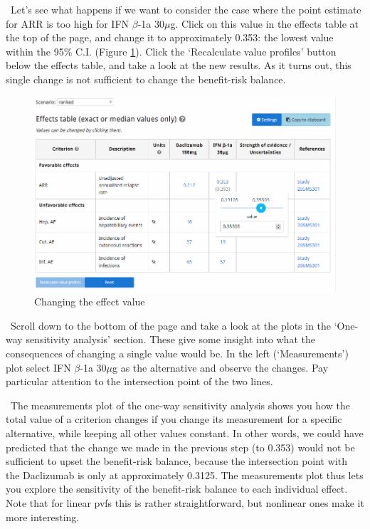 \documentclass[00_mcda_tutorial.tex]{subfiles}
\begin{document}
\noindent \leftpointright \, Let’s see what happens if we want to consider the case where the point estimate for ARR is too high for IFN $\beta$-1a 30$\mu$g. Click on this value in the effects table at the top of the page, and change it to approximately 0.353: the lowest value within the 95\% C.I. (Figure \ref{fig:changeARR}). Click the ‘Recalculate value profiles’ button below the effects table, and take a look at the new results. As it turns out, this single change is not sufficient to change the benefit-risk balance.
\newline

\begin{figure}[!h]
    \centering
	\includegraphics[width=\textwidth]{fig/changeARR.png}
    \caption{Changing the effect value}
	\label{fig:changeARR}
\end{figure}

\noindent \leftpointright \, Scroll down to the bottom of the page and take a look at the plots in the ‘One-way sensitivity analysis’ section. These give some insight into what the consequences of changing a single value would be. In the left (‘Measurements’) plot select IFN $\beta$-1a 30$\mu$g as the alternative and observe the changes. Pay particular attention to the intersection point of the two lines.
\newline

\noindent \faGraduationCap \, The measurements plot of the one-way sensitivity analysis shows you how the total value of a criterion changes if you change its measurement for a specific alternative, while keeping all other values constant. In other words, we could have predicted that the change we made in the previous step (to 0.353) would not be sufficient to upset the benefit-risk balance, because the intersection point with the Daclizumab is only at approximately 0.3125. The measurements plot thus lets you explore the sensitivity of the benefit-risk balance to each individual effect. Note that for linear pvfs this is rather straightforward, but nonlinear ones make it more interesting.
\newline
\end{document}
